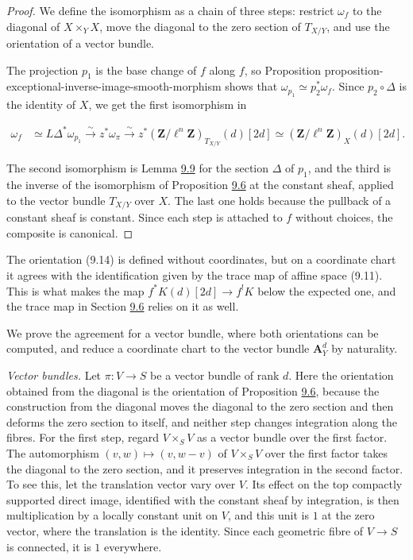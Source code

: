 \documentclass[11pt]{article}
\begin{document}
\begin{proof}[{Proof}]\label{bp37}%
We define the isomorphism as a chain of three steps: restrict \(\omega_f\) to the diagonal of \(X\times_YX\), move the diagonal to the zero section of \(T_{X/Y}\), and use the orientation of a vector bundle.

The projection \(p_1\) is the base change of \(f\) along \(f\), so Proposition proposition-exceptional-inverse-image-smooth-morphism shows that \(\omega_{p_1}\simeq p_2^{*}\omega_f\). Since \(p_2\circ\Delta\) is the identity of \(X\), we get the first isomorphism in

\[
\begin{aligned}
\omega_{f}
&\simeq L\Delta^{*}\omega_{p_1}
\xrightarrow{\sim}z^{*}\omega_{\pi}
\xrightarrow{\sim}z^{*}(\mathbf Z/\ell^n\mathbf Z)_{T_{X/Y}}(d)[2d]
\simeq(\mathbf Z/\ell^n\mathbf Z)_{X}(d)[2d].
\end{aligned}
\]

The second isomorphism is Lemma \hyperref[bp29]{9.9} for the section \(\Delta\) of \(p_1\), and the third is the inverse of the isomorphism of Proposition \hyperref[bp21]{9.6} at the constant sheaf, applied to the vector bundle \(T_{X/Y}\) over \(X\). The last one holds because the pullback of a constant sheaf is constant. Since each step is attached to \(f\) without choices, the composite is canonical.
\end{proof}

\label{bp38}%
The orientation (9.14) is defined without coordinates, but on a coordinate chart it agrees with the identification given by the trace map of affine space (9.11). This is what makes the map \(f^*K(d)[2d]\to f^!K\) below the expected one, and the trace map in Section \hyperref[bp74]{9.6} relies on it as well.

We prove the agreement for a vector bundle, where both orientations can be computed, and reduce a coordinate chart to the vector bundle \(\mathbf A^d_Y\) by naturality.

\emph{Vector bundles.} Let \(\pi:V\to S\) be a vector bundle of rank \(d\). Here the orientation obtained from the diagonal is the orientation of Proposition \hyperref[bp21]{9.6}, because the construction from the diagonal moves the diagonal to the zero section and then deforms the zero section to itself, and neither step changes integration along the fibres. For the first step, regard \(V\times_SV\) as a vector bundle over the first factor. The automorphism \((v,w)\mapsto(v,w-v)\) of \(V\times_SV\) over the first factor takes the diagonal to the zero section, and it preserves integration in the second factor. To see this, let the translation vector vary over \(V\). Its effect on the top compactly supported direct image, identified with the constant sheaf by integration, is then multiplication by a locally constant unit on \(V\), and this unit is \(1\) at the zero vector, where the translation is the identity. Since each geometric fibre of \(V\to S\) is connected, it is \(1\) everywhere.
\end{document}

